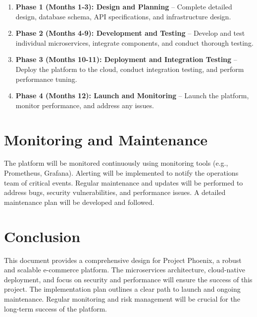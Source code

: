 \documentclass[11pt,a4paper,oneside]{article}
\begin{document}
\begin{enumerate}
    \item \textbf{Phase 1 (Months 1-3): Design and Planning} -- Complete detailed design, database schema, API specifications, and infrastructure design.
    \item \textbf{Phase 2 (Months 4-9): Development and Testing} -- Develop and test individual microservices, integrate components, and conduct thorough testing.
    \item \textbf{Phase 3 (Months 10-11): Deployment and Integration Testing} -- Deploy the platform to the cloud, conduct integration testing, and perform performance tuning.
    \item \textbf{Phase 4 (Months 12): Launch and Monitoring} -- Launch the platform, monitor performance, and address any issues.
\end{enumerate}

\section{Monitoring and Maintenance}

The platform will be monitored continuously using monitoring tools (e.g., Prometheus, Grafana).  Alerting will be implemented to notify the operations team of critical events.  Regular maintenance and updates will be performed to address bugs, security vulnerabilities, and performance issues.  A detailed maintenance plan will be developed and followed.

\section{Conclusion}

This document provides a comprehensive design for Project Phoenix, a robust and scalable e-commerce platform.  The microservices architecture, cloud-native deployment, and focus on security and performance will ensure the success of this project.  The implementation plan outlines a clear path to launch and ongoing maintenance.  Regular monitoring and risk management will be crucial for the long-term success of the platform.
\end{document}
